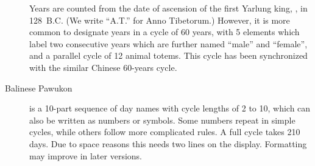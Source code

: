 \begin{description}
  Years are counted from the date of ascension of the first Yarlung
  king, , in 128~B.C. (We write ``A.T.'' for Anno
  Tibetorum.) However, it is more common to designate years in a cycle
  of 60 years, with 5 elements which label two consecutive years which
  are further named ``male'' and ``female'', and a parallel cycle of
  12 animal totems. This cycle has been synchronized with the similar
  Chinese 60-years cycle.
  
\item[Balinese Pawukon] is a 10-part sequence of day names with cycle
  lengths of 2 to 10, which can also be written as numbers or
  symbols. Some numbers repeat in simple cycles, while others follow
  more complicated rules. A full cycle takes 210 days.  Due to space
  reasons this needs two lines on the display. Formatting may improve
  in later versions.
\end{description}

